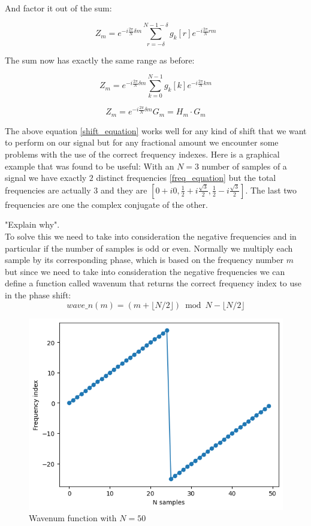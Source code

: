\documentclass[]{usiinfbachelorproject}
\begin{document}
	And factor it out of the sum:
	
	\begin{equation*}
		Z_m = e^{-i \frac{2\pi}{N}  \delta m} \displaystyle\sum_{r= -\delta}^{N-1 - \delta}g_k[r]e^{-i \frac{2\pi}{N} rm}
	\end{equation*}
	
	The sum now has exactly the same range as before:
	
	\begin{equation*}
		Z_m = e^{-i \frac{2\pi}{N}  \delta m} \displaystyle\sum_{k=0}^{N-1}g_k[k]e^{-i \frac{2\pi}{N} km}
	\end{equation*}
	
	\begin{equation}
		Z_m = e^{-i \frac{2\pi}{N}  \delta m} G_m = H_m \cdot G_m \label{shift_equation}
	\end{equation}
	
	
	The above equation \ref{shift_equation} works well for any kind of shift that we want to perform on our signal but for any fractional amount we encounter some problems with the use of the correct frequency indexes.
	Here is a graphical example that was found to be useful: With an $N=3$ number of samples of a signal we have exactly $2$ distinct frequencies \ref{freq_equation} but the total frequencies are actually $3$ and they are $[0+i0, \frac{1}{2}+i\frac{\sqrt{3}}{2}, \frac{1}{2}-i\frac{\sqrt{3}}{2}]$. The last two frequencies are one the complex conjugate of the other.
	
	
	
	"Explain why".\\
	To solve this we need to take into consideration the negative frequencies and in particular if the number of samples is odd or even.
	Normally we multiply each sample by its corresponding phase, which is based on the frequency number $m$
	but since we need to take into consideration the negative frequencies we can define a function called wavenum that returns the correct frequency index to use in the phase shift:
	\begin{equation*}
		wave\_n(m) = (m + \lfloor N/2 \rfloor ) \bmod N - \lfloor N/2 \rfloor
	\end{equation*}
	
	\begin{figure}[h]
		\centering
		\includegraphics[width=0.5\columnwidth]{images/wavenum_n50.png}
		\caption{Wavenum function with $N=50$}
	\end{figure}
	
\end{document}
